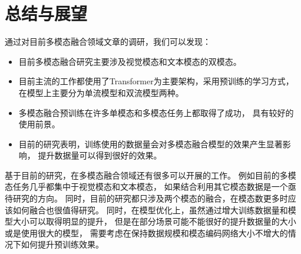 \chapter{总结与展望}\label{chap:conclusion}

通过对目前多模态融合领域文章的调研，我们可以发现：

\begin{itemize}
    \item 目前多模态融合研究主要涉及视觉模态和文本模态的双模态。
    \item 目前主流的工作都使用了Transformer为主要架构，采用预训练的学习方式，
    在模型上主要分为单流模型和双流模型两种。
    \item 多模态融合预训练在许多单模态和多模态任务上都取得了成功，
    具有较好的使用前景。
    \item 目前的研究表明，训练使用的数据量会对多模态融合模型的效果产生显著影响，
    提升数据量可以得到很好的效果。
\end{itemize}

基于目前的研究，在多模态融合领域还有很多可以开展的工作。
例如目前的多模态任务几乎都集中于视觉模态和文本模态，
如果结合利用其它模态数据是一个亟待研究的方向。
同时，目前的研究都只涉及两个模态的融合，在模态数更多时应该如何融合也很值得研究。
同时，在模型优化上，虽然通过增大训练数据量和模型大小可以取得明显的提升，
但是在部分场景可能不能很好的提升数据量的大小或是使用很大的模型，
需要考虑在保持数据规模和模态编码网络大小不增大的情况下如何提升预训练效果。